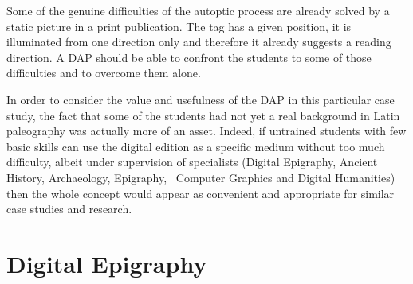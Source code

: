 \documentclass[amsthm,ebook]{saparticle}
\begin{document}
Some of the genuine difficulties of the autoptic process are already solved by a static picture in a print publication.
The tag has a given position, it is illuminated from one direction only and therefore it already suggests a reading
direction. A DAP should be able to confront the students to some of those difficulties and to overcome them alone.

In order to consider the value and usefulness of the DAP in this particular case study, the fact that some of the
students had not yet a real background in Latin paleography was actually more of an asset. Indeed, if untrained
students with few basic skills can use the digital edition as a specific medium without too much difficulty, albeit
under supervision of specialists (Digital Epigraphy, Ancient History, Archaeology, Epigraphy, \ Computer Graphics and
Digital Humanities) then the whole concept would appear as convenient and appropriate for similar case studies and
research. 

\section{Digital Epigraphy}
\end{document}
